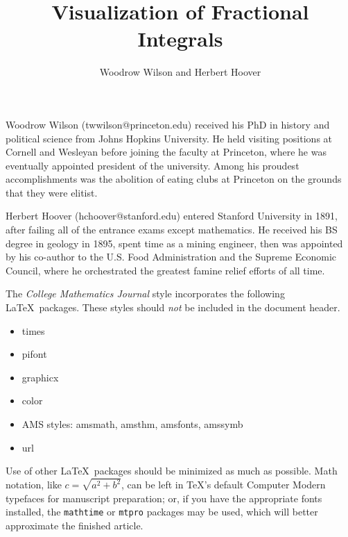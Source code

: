 \documentclass{article}
\theoremstyle{theorem}
\theoremstyle{definition}
\begin{document}
\title{Visualization of Fractional Integrals}
\author{Woodrow Wilson and Herbert Hoover} %

\maketitle


\begin{biog} %
\item[\biogpic{\texttt{[image: Woodrow\_Wilson.pdf]}}Woodrow Wilson] (twwilson@princeton.edu) received his PhD in history and political science from Johns Hopkins University. He held visiting positions at Cornell and Wesleyan before joining the faculty at Princeton, where he was eventually appointed president of the university.  Among his proudest accomplishments was the abolition of eating clubs at Princeton on the grounds that they were elitist.

\item[\biogpic{\texttt{[image: Herbert\_Hoover.pdf]}}Herbert Hoover] (hchoover@stanford.edu) entered Stanford University in 1891, after failing all of the entrance exams except mathematics.  He received his BS degree in geology in 1895, spent time as a mining engineer, then was appointed by his co-author to the U.S. Food Administration and the Supreme Economic Council, where he orchestrated the greatest famine relief efforts of all time.
\end{biog}


\noindent
The \textit{College Mathematics Journal} style incorporates the following \LaTeX\ packages.  These styles should \textit{not} be included in the document header.
\begin{itemize}
\item times
\item pifont
\item graphicx
\item color
\item AMS styles: amsmath, amsthm, amsfonts, amssymb
\item url
\end{itemize}
Use of other \LaTeX\ packages should be minimized as much as possible. Math notation, like $c = \sqrt{a^2 +b^2}$, can be left in \TeX's default Computer Modern typefaces for manuscript preparation; or, if you have the appropriate fonts installed, the \texttt{mathtime} or \texttt{mtpro} packages may be used, which will better approximate the finished article.
\end{document}
